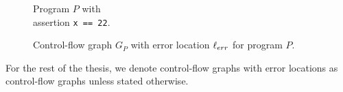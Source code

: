 \begin{center}
	\begin{minipage}[b]{0.4\linewidth}
		\begin{figure}[H]
			\centering
			
			\caption{Program $P$ with \\ assertion \texttt{x == 22}.}
			\label{codeWithAss}
		\end{figure}
	\end{minipage}
	\hfill
	\begin{minipage}[b]{0.59\linewidth}
		\begin{figure}[H]
			\centering
			
			\caption{Control-flow graph $G_P$ with error location $\ell_{err}$ for program $P$.}
			\label{cfg:P:Ass}
		\end{figure}
	\end{minipage}
\end{center}
For the rest of the thesis, we denote control-flow graphs with error locations as control-flow graphs unless stated otherwise.
